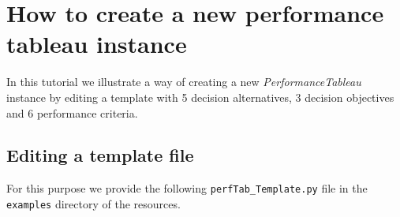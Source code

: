 \chapter{How to create a new performance tableau instance}
\label{sec:4}



In this tutorial we illustrate a way of creating a new {\em PerformanceTableau\/} instance by editing a template with 5 decision alternatives, 3 decision objectives and 6 performance criteria. 

\section{Editing a template file}
\label{sec:4.1}

For this purpose we provide the following {\tt perfTab\_Template.py} file in the \texttt{examples} directory of the \Digraph resources.

